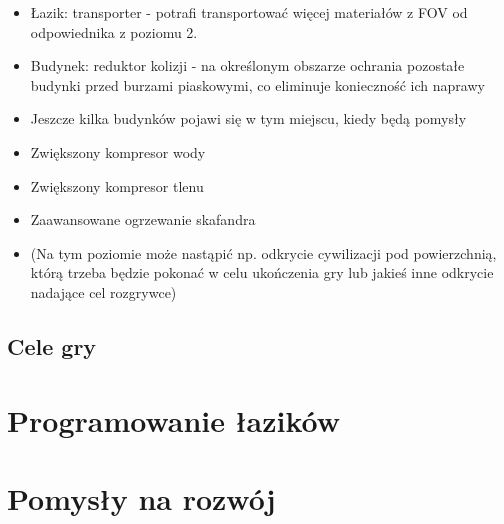 \documentclass[a4paper,12pt]{article}
\begin{document}
\begin{itemize}
\begin{itemize}
		\item Łazik: transporter - potrafi transportować więcej materiałów z FOV od odpowiednika z poziomu 2.
		\item Budynek: reduktor kolizji - na określonym obszarze ochrania pozostałe budynki przed burzami piaskowymi, co eliminuje konieczność ich naprawy
		\item Jeszcze kilka budynków pojawi się w tym miejscu, kiedy będą pomysły
		\item Zwiększony kompresor wody
		\item Zwiększony kompresor tlenu
		\item Zaawansowane ogrzewanie skafandra
		\item (Na tym poziomie może nastąpić np. odkrycie cywilizacji pod powierzchnią, którą trzeba będzie pokonać w celu ukończenia gry lub jakieś inne odkrycie nadające cel rozgrywce)
	\end{itemize}
\end{itemize}
\subsection{Cele gry}
\section{Programowanie łazików}
\label{section:programming}
\section{Pomysły na rozwój}
\end{document}
